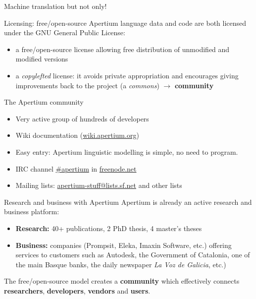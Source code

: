 \documentclass[final]{beamer} %
\newlength{\wideitemsep}
\let\olditem\item
\renewcommand{\item}{\setlength{\itemsep}{\wideitemsep}\olditem}
\begin{document}
\begin{frame}
\begin{columns}
\begin{column}{1\textwidth}
\begin{block}{Machine translation but not only!}
\end{block}

\begin{block}{Licensing: free/open-source}
Apertium language data and code are both licensed under the GNU General Public License:\begin{itemize}
\item a free/open-source license allowing free distribution of unmodified and modified versions
\item a \textit{copylefted} license: it avoids private appropriation and encourages giving improvements back to the project (a \textit{commons}) \(\to\) \textbf{community}
\end{itemize}
\end{block}

\begin{block}{The Apertium community}
\begin{itemize}
\item Very active group of hundreds of developers 
\item Wiki documentation (\url{wiki.apertium.org})
\item Easy entry: Apertium linguistic modelling is simple, no need to program.
\item IRC channel \url{\#apertium} in \url{freenode.net}
\item Mailing lists: \url{apertium-stuff@lists.sf.net} and other lists
\end{itemize}

\end{block}




\begin{block}{Research and business with Apertium}
  Apertium is already an active research and business platform:
  \begin{itemize}
    \item \textbf{Research:} 40+ publications, 2 PhD thesis, 4 master's theses
    \item \textbf{Business:} companies (Prompsit, Eleka,
      Imaxin Software, etc.) offering services to customers such as
      Autodesk, the Government of Catalonia, one of the main Basque
      banks, the daily newspaper \emph{La Voz de Galicia}, etc.)
  \end{itemize}
  The free/open-source model creates a \textbf{community} which effectively
  connects \textbf{researchers}, \textbf{developers}, \textbf{vendors} and \textbf{users}.
\end{block}


\end{column}
\end{columns}
\end{frame}
\end{document}
